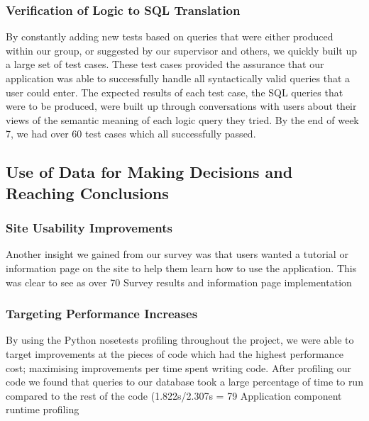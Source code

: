 \documentclass[a4paper, 11pt]{article}
\begin{document}
\subsubsection{Verification of Logic to SQL Translation}
By constantly adding new tests based on queries that were either produced within our group, or suggested by our supervisor and others, we quickly built up a large set of test cases. These test cases provided the assurance that our application was able to successfully handle all syntactically valid queries that a user could enter. The expected results of each test case, the SQL queries that were to be produced, were built up through conversations with users about their views of the semantic meaning of each logic query they tried. By the end of week 7, we had over  60 test cases which all successfully passed.

\subsection{Use of Data for Making Decisions and Reaching Conclusions}

\subsubsection{Site Usability Improvements}
Another insight we gained from our survey was that users wanted a tutorial or information page on the site to help them learn how to use the application. This was clear to see as over 70%
Survey results and information page implementation
\subsubsection{Targeting Performance Increases}
By using the Python nosetests profiling throughout the project, we were able to target improvements at the pieces of code which had the highest performance cost; maximising improvements per time spent writing code.
After profiling our code we found that queries to our database took a large percentage of time to run compared to the rest of the code (1.822s/2.307s = 79%
Application component runtime profiling
\end{document}

